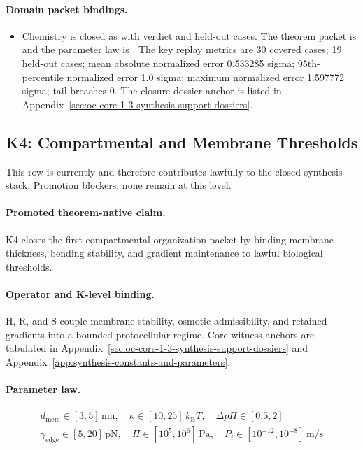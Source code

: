 \paragraph{Domain packet bindings.}
\begin{itemize}[leftmargin=1.6em,nosep]
\item Chemistry is closed as  with verdict  and  held-out cases. The theorem packet is  and the parameter law is . The key replay metrics are 30 covered cases; 19 held-out cases; mean absolute normalized error 0.533285 sigma; 95th-percentile normalized error 1.0 sigma; maximum normalized error 1.597772 sigma; tail breaches 0. The closure dossier anchor is listed in Appendix~\ref{sec:oc-core-1-3-synthesis-support-dossiers}.
\end{itemize}

\subsection{K4: Compartmental and Membrane Thresholds}
\label{sec:oc-core-1-3-synthesis-k4}
This row is currently  and therefore contributes lawfully to the closed synthesis stack.
Promotion blockers: none remain at this level.

\paragraph{Promoted theorem-native claim.}
K4 closes the first compartmental organization packet by binding membrane thickness, bending stability, and gradient maintenance to lawful biological thresholds.

\paragraph{Operator and K-level binding.}
H, R, and S couple membrane stability, osmotic admissibility, and retained gradients into a bounded protocellular regime.
Core witness anchors are tabulated in Appendix~\ref{sec:oc-core-1-3-synthesis-support-dossiers} and Appendix~\ref{app:synthesis-constants-and-parameters}.

\paragraph{Parameter law.}
\[
\begin{gathered} d_{\mathrm{mem}} \in [3, 5]\,\mathrm{nm},\quad \kappa \in [10, 25]\,k_{\mathrm{B}}T,\quad \Delta pH \in [0.5, 2] \\ \gamma_{\mathrm{edge}} \in [5,20]\,\mathrm{pN},\quad \Pi \in [10^5,10^6]\,\mathrm{Pa},\quad P_i \in [10^{-12},10^{-8}]\,\mathrm{m/s} \end{gathered}
\]


